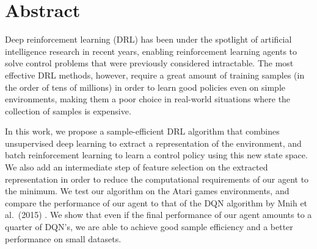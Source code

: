 \newpage
\chapter*{Abstract}


\vspace{0.5cm}

Deep reinforcement learning (DRL) has been under the spotlight of artificial 
intelligence research in recent years, enabling reinforcement learning agents 
to solve control problems that were previously considered intractable. 
The most effective DRL methods, however, require a great amount of training 
samples (in the order of tens of millions) in order to learn good policies
even on simple environments, making them a poor choice in real-world situations
where the collection of samples is expensive.

In this work, we propose a sample-efficient DRL algorithm that combines 
unsupervised deep learning to extract a representation of the environment, and 
batch reinforcement learning to learn a control policy using this new state 
space.
We also add an intermediate step of feature selection on the extracted 
representation in order to reduce the computational requirements of our agent to 
the minimum.
We test our algorithm on the Atari games environments, and compare the 
performance of our agent to that of the DQN algorithm by Mnih et al.\ (2015) 
\cite{mnih2015human}.
We show that even if the final performance of our agent amounts to a quarter of 
DQN's, we are able to achieve good sample efficiency and a better performance on
small datasets.